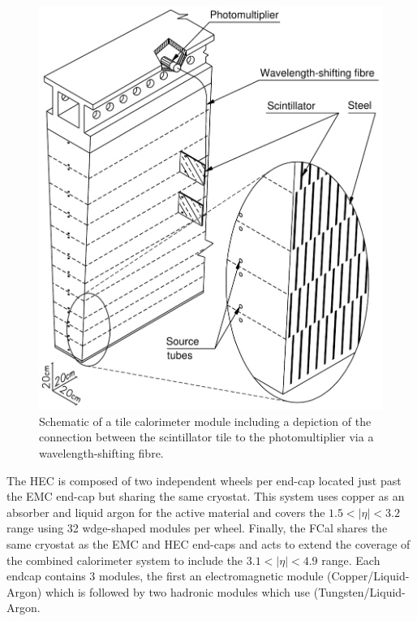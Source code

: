 \begin{figure}[!htbp]
  \begin{center}
    \includegraphics[width=0.8\linewidth]{figures/atlas/tile_calorimeter.pdf}
    \caption{ \cite{PERF-2007-01} Schematic of a tile calorimeter module
including a depiction of the connection between the scintillator tile to the
photomultiplier via a wavelength-shifting fibre.}
    \label{fig:tile_calorimeter}
  \end{center}
\end{figure}

The HEC is composed of two independent wheels per end-cap located just past the
EMC end-cap but sharing the same cryostat. This system  uses copper as an
absorber and liquid argon for the active material and covers the $1.5 < |\eta| <
3.2$ range using 32 wdge-shaped modules per wheel. Finally, the FCal shares the
same cryostat as the EMC and HEC end-caps and acts to extend the coverage of the
combined calorimeter system to include the $3.1 < |\eta| < 4.9$ range.  Each
endcap contains 3 modules, the first an electromagnetic module
(Copper/Liquid-Argon) which is followed by two hadronic modules which use
(Tungsten/Liquid-Argon.
